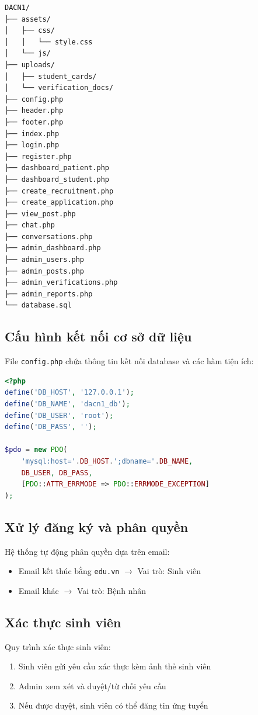 \documentclass[a4paper,13pt]{extreport}
\begin{document}
\begin{verbatim}
DACN1/
├── assets/
│   ├── css/
│   │   └── style.css
│   └── js/
├── uploads/
│   ├── student_cards/
│   └── verification_docs/
├── config.php
├── header.php
├── footer.php
├── index.php
├── login.php
├── register.php
├── dashboard_patient.php
├── dashboard_student.php
├── create_recruitment.php
├── create_application.php
├── view_post.php
├── chat.php
├── conversations.php
├── admin_dashboard.php
├── admin_users.php
├── admin_posts.php
├── admin_verifications.php
├── admin_reports.php
└── database.sql
\end{verbatim}

\subsection{Cấu hình kết nối cơ sở dữ liệu}

File \texttt{config.php} chứa thông tin kết nối database và các hàm tiện ích:

\begin{lstlisting}[language=PHP]
<?php
define('DB_HOST', '127.0.0.1');
define('DB_NAME', 'dacn1_db');
define('DB_USER', 'root');
define('DB_PASS', '');

$pdo = new PDO(
    'mysql:host='.DB_HOST.';dbname='.DB_NAME,
    DB_USER, DB_PASS,
    [PDO::ATTR_ERRMODE => PDO::ERRMODE_EXCEPTION]
);
\end{lstlisting}

\subsection{Xử lý đăng ký và phân quyền}

Hệ thống tự động phân quyền dựa trên email:
\begin{itemize}
    \item Email kết thúc bằng \texttt{edu.vn} $\rightarrow$ Vai trò: Sinh viên
    \item Email khác $\rightarrow$ Vai trò: Bệnh nhân
\end{itemize}

\subsection{Xác thực sinh viên}

Quy trình xác thực sinh viên:
\begin{enumerate}
    \item Sinh viên gửi yêu cầu xác thực kèm ảnh thẻ sinh viên
    \item Admin xem xét và duyệt/từ chối yêu cầu
    \item Nếu được duyệt, sinh viên có thể đăng tin ứng tuyển
\end{enumerate}
\end{document}
